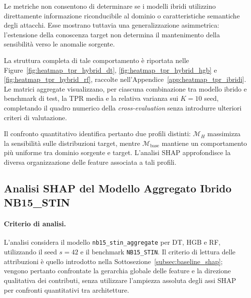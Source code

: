 Le metriche non consentono di determinare se i modelli ibridi utilizzino direttamente informazione riconducibile al dominio o caratteristiche semantiche degli attacchi. 
Esse mostrano tuttavia una generalizzazione asimmetrica: l'estensione della conoscenza target non determina il mantenimento della sensibilità verso le anomalie sorgente.

La struttura completa di tale comportamento è riportata nelle Figure~\ref{fig:heatmap_tpr_hybrid_dt}, \ref{fig:heatmap_tpr_hybrid_hgb} e \ref{fig:heatmap_tpr_hybrid_rf}, raccolte nell'Appendice~\ref{app:heatmap_tpr_ibridi}.
Le matrici aggregate visualizzano, per ciascuna combinazione tra modello ibrido e benchmark di test, la TPR media e la relativa varianza sui $K=10$ seed, completando il quadro numerico della \textit{cross-evaluation} senza introdurre ulteriori criteri di valutazione.

Il confronto quantitativo identifica pertanto due profili distinti: $\mathcal{M}_{H}$ massimizza la sensibilità sulle distribuzioni target, mentre $\mathcal{M}_{\mathrm{base}}$ mantiene un comportamento più uniforme tra dominio sorgente e target. 
L'analisi SHAP approfondisce la diversa organizzazione delle feature associata a tali profili.



\subsection{Analisi SHAP del Modello Aggregato Ibrido NB15\_STIN}
\label{subsec:ibridi_shap}

\paragraph{Criterio di analisi.}
L'analisi considera il modello \texttt{nb15\_stin\_aggregate} per DT, HGB e RF, utilizzando il seed $s=42$ e il benchmark \texttt{NB15\_STIN}. 
Il criterio di lettura delle attribuzioni è quello introdotto nella Sottosezione~\ref{subsec:baseline_shap}; vengono pertanto confrontate la gerarchia globale delle feature e la direzione qualitativa dei contributi, senza utilizzare l'ampiezza assoluta degli assi SHAP per confronti quantitativi tra architetture.


